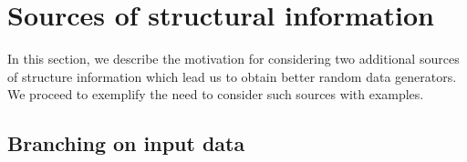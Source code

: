 \section{Sources of structural information}


In this section, we describe the motivation for considering two additional
sources of structure information which lead us to obtain better random data
generators. %
%
%
%
We proceed to exemplify the need to consider such sources with examples.

\subsection{Branching on input data}

